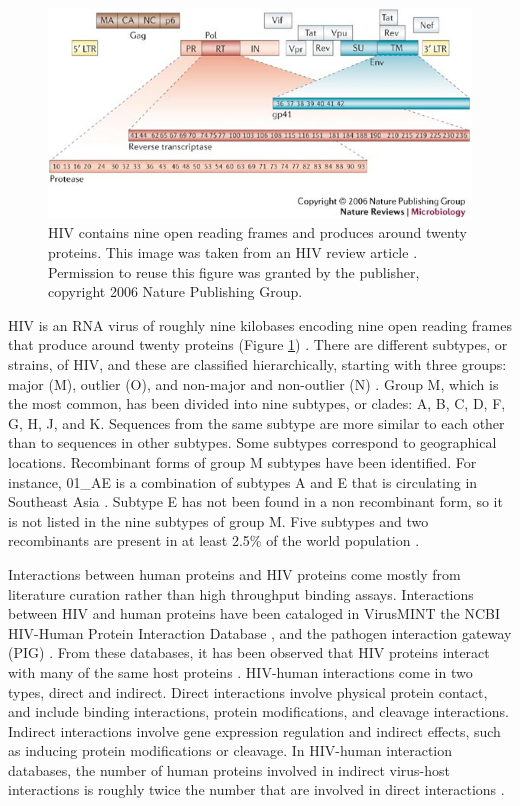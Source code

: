 \begin{figure}
\begin{center}
\includegraphics[scale=0.75]{figs/hiv_proteins}
\end{center}
\caption[HIV genome]{\small HIV contains nine open reading frames and
  produces around twenty proteins. This image was taken from an HIV
  review article \cite{lengauer2006bioinformatics}. Permission to
  reuse this figure was granted by the publisher, copyright 2006
  Nature Publishing Group. \label{fig:hiv_proteins}}
\end{figure}

HIV is an RNA virus of roughly nine kilobases encoding nine open reading
frames that produce around twenty proteins (Figure
\ref{fig:hiv_proteins}) \cite{frankel2003hiv}. There are different
subtypes, or strains, of HIV, and these are classified hierarchically,
starting with three groups: major (M), outlier (O), and non-major and
non-outlier (N) \cite{taylor08}. Group M, which is the most common,
has been divided into nine subtypes, or clades: A, B, C, D, F, G, H,
J, and K. Sequences from the same subtype are more similar to each
other than to sequences in other subtypes. Some subtypes correspond to
geographical locations. Recombinant forms of group M subtypes have
been identified. For instance, 01\_AE is a combination of subtypes A
and E that is circulating in Southeast Asia \cite{taylor08}. Subtype E
has not been found in a non recombinant form, so it is not listed in
the nine subtypes of group M. Five subtypes and two recombinants are
present in at least 2.5\% of the world population \cite{taylor08}.

Interactions between human proteins and HIV proteins come mostly from
literature curation rather than high throughput binding
assays. Interactions between HIV and human proteins have been
cataloged in VirusMINT \cite{chatr08} the NCBI HIV-Human Protein
Interaction Database \cite{ptak08}, and the pathogen interaction
gateway (PIG) \cite{driscoll2009pig}. From these databases, it has
been observed that HIV proteins interact with many of the same host
proteins \cite{fu09}. HIV-human interactions come in two types, direct
and indirect. Direct interactions involve physical protein contact,
and include binding interactions, protein modifications, and cleavage
interactions. Indirect interactions involve gene expression regulation
and indirect effects, such as inducing protein modifications or
cleavage. In HIV-human interaction databases, the number of human
proteins involved in indirect virus-host interactions is roughly twice
the number that are involved in direct interactions \cite{fu09}.


